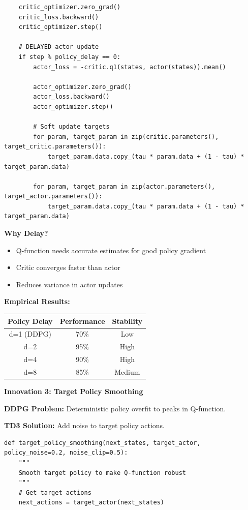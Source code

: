 \documentclass[12pt]{article}
\begin{document}
{{\begin{verbatim}
    critic_optimizer.zero_grad()
    critic_loss.backward()
    critic_optimizer.step()
    
    # DELAYED actor update
    if step % policy_delay == 0:
        actor_loss = -critic.q1(states, actor(states)).mean()
        
        actor_optimizer.zero_grad()
        actor_loss.backward()
        actor_optimizer.step()
        
        # Soft update targets
        for param, target_param in zip(critic.parameters(), target_critic.parameters()):
            target_param.data.copy_(tau * param.data + (1 - tau) * target_param.data)
        
        for param, target_param in zip(actor.parameters(), target_actor.parameters()):
            target_param.data.copy_(tau * param.data + (1 - tau) * target_param.data)
\end{verbatim}

\textbf{Why Delay?}
\begin{itemize}
\item Q-function needs accurate estimates for good policy gradient
\item Critic converges faster than actor
\item Reduces variance in actor updates
\end{itemize}

\textbf{Empirical Results:}
\begin{center}
\begin{tabular}{|c|c|c|}
\hline
\textbf{Policy Delay} & \textbf{Performance} & \textbf{Stability} \\
\hline
d=1 (DDPG) & 70\% & Low \\
d=2 & 95\% & High \\
d=4 & 90\% & High \\
d=8 & 85\% & Medium \\
\hline
\end{tabular}
\end{center}

\textbf{Innovation 3: Target Policy Smoothing}

\textbf{DDPG Problem:} Deterministic policy overfit to peaks in Q-function.

\textbf{TD3 Solution:} Add noise to target policy actions.

\begin{verbatim}
def target_policy_smoothing(next_states, target_actor, policy_noise=0.2, noise_clip=0.5):
    """
    Smooth target policy to make Q-function robust
    """
    # Get target actions
    next_actions = target_actor(next_states)
    

\end{verbatim}}}
\end{document}
